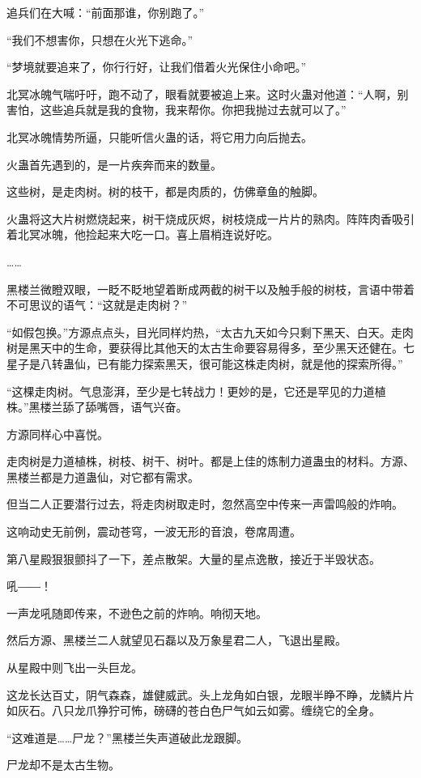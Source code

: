 \begin{this_body}
追兵们在大喊：“前面那谁，你别跑了。”

“我们不想害你，只想在火光下逃命。”

“梦境就要追来了，你行行好，让我们借着火光保住小命吧。”

北冥冰魄气喘吁吁，跑不动了，眼看就要被追上来。这时火蛊对他道：“人啊，别害怕，这些追兵就是我的食物，我来帮你。你把我抛过去就可以了。”

北冥冰魄情势所逼，只能听信火蛊的话，将它用力向后抛去。

火蛊首先遇到的，是一片疾奔而来的数量。

这些树，是走肉树。树的枝干，都是肉质的，仿佛章鱼的触脚。

火蛊将这大片树燃烧起来，树干烧成灰烬，树枝烧成一片片的熟肉。阵阵肉香吸引着北冥冰魄，他捡起来大吃一口。喜上眉梢连说好吃。

……

黑楼兰微瞪双眼，一眨不眨地望着断成两截的树干以及触手般的树枝，言语中带着不可思议的语气：“这就是走肉树？”

“如假包换。”方源点点头，目光同样灼热，“太古九天如今只剩下黑天、白天。走肉树是黑天中的生命，要获得比其他天的太古生命要容易得多，至少黑天还健在。七星子是八转蛊仙，已有能力探索黑天，很可能这株走肉树，就是他的探索所得。”

“这棵走肉树。气息澎湃，至少是七转战力！更妙的是，它还是罕见的力道植株。”黑楼兰舔了舔嘴唇，语气兴奋。

方源同样心中喜悦。

走肉树是力道植株，树枝、树干、树叶。都是上佳的炼制力道蛊虫的材料。方源、黑楼兰都是力道蛊仙，对它都有需求。

但当二人正要潜行过去，将走肉树取走时，忽然高空中传来一声雷鸣般的炸响。

这响动史无前例，震动苍穹，一波无形的音浪，卷席周遭。

第八星殿狠狠颤抖了一下，差点散架。大量的星点逸散，接近于半毁状态。

吼――！

一声龙吼随即传来，不逊色之前的炸响。响彻天地。

然后方源、黑楼兰二人就望见石磊以及万象星君二人，飞退出星殿。

从星殿中则飞出一头巨龙。

这龙长达百丈，阴气森森，雄健威武。头上龙角如白银，龙眼半睁不睁，龙鳞片片如灰石。八只龙爪狰狞可怖，磅礴的苍白色尸气如云如雾。缠绕它的全身。

“这难道是……尸龙？”黑楼兰失声道破此龙跟脚。

尸龙却不是太古生物。


\end{this_body}
